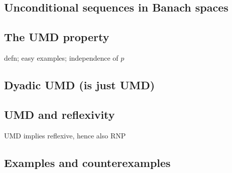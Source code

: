 \subsection{Unconditional sequences in Banach spaces}

\subsection{The UMD property}

defn; easy examples; independence of $p$

\subsection{Dyadic UMD (is just UMD)}

\subsection{UMD and reflexivity}

UMD implies reflexive, hence also RNP

\subsection{Examples and counterexamples}

